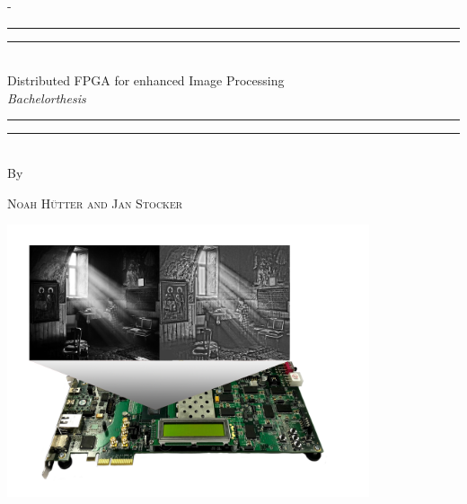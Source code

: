 \begin{titlingpage}
\begin{SingleSpace}
\calccentering{\unitlength} 
\begin{adjustwidth*}{\unitlength}{-\unitlength}
\vspace*{0mm}
\begin{center}
\rule[0.5ex]{\linewidth}{2pt}\vspace*{-\baselineskip}\vspace*{3.2pt}
\rule[0.5ex]{\linewidth}{1pt}\\[\baselineskip]

{\HUGE Distributed FPGA for enhanced Image Processing }\\[4mm]
{\Large \textit{Bachelorthesis}}\\

\rule[0.5ex]{\linewidth}{1pt}\vspace*{-\baselineskip}\vspace{3.2pt}
\rule[0.5ex]{\linewidth}{2pt}\\
\vspace{2mm}
{\large By}\\
\vspace{2mm}

{\large\textsc{Noah H\"utter and Jan Stocker}}\\

\vspace{11mm}

\includegraphics[width=0.8\textwidth]{images/titlepage/p6_titlepage.png}\\

\vspace{2mm}


\end{center}
\end{adjustwidth*}
\end{SingleSpace}
\end{titlingpage}
